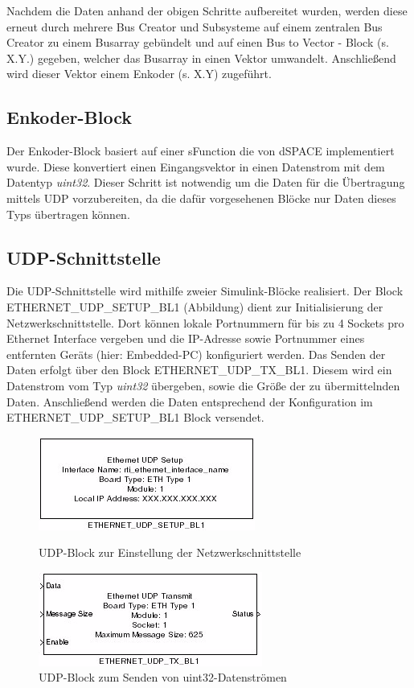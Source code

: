\documentclass[fontsize = 12pt, paper = a4]{scrreprt}
\begin{document}
Nachdem die Daten anhand der obigen Schritte aufbereitet wurden, werden diese erneut durch mehrere Bus Creator und Subsysteme auf einem zentralen Bus Creator zu einem Busarray gebündelt und auf einen Bus to Vector - Block (s. X.Y.) gegeben, welcher das Busarray in einen Vektor umwandelt. Anschließend wird dieser Vektor einem Enkoder (s. X.Y) zugeführt.

\newpage

\subsection{Enkoder-Block}

Der Enkoder-Block basiert auf einer sFunction die von dSPACE implementiert wurde. Diese konvertiert einen Eingangsvektor in einen Datenstrom mit dem Datentyp \textit{uint32}. Dieser Schritt ist notwendig um die Daten für die Übertragung mittels UDP vorzubereiten, da die dafür vorgesehenen Blöcke nur Daten dieses Typs übertragen können. 

\subsection{UDP-Schnittstelle}

Die UDP-Schnittstelle wird mithilfe zweier Simulink-Blöcke realisiert. Der Block ETHERNET\_UDP\_SETUP\_BL1 (\*Abbildung\*) dient zur Initialisierung der Netzwerkschnittstelle. Dort können lokale Portnummern für bis zu 4 Sockets pro Ethernet Interface vergeben und die IP-Adresse sowie Portnummer eines entfernten Geräts (hier: Embedded-PC) konfiguriert werden. Das Senden der Daten erfolgt über den Block ETHERNET\_UDP\_TX\_BL1. Diesem wird ein Datenstrom vom Typ \textit{uint32} übergeben, sowie die Größe der zu übermittelnden Daten. Anschließend werden die Daten entsprechend der Konfiguration im ETHERNET\_UDP\_SETUP\_BL1 Block versendet. 
 
\begin{figure}[h]
  \centering
\begin{minipage}[b]{2.5cm}
    \includegraphics[scale = 1]{ethernet_udp_setup_block.png}
    \caption{UDP-Block zur Einstellung der Netzwerkschnittstelle}
  \end{minipage}
\hspace*{3cm}  
  \begin{minipage}[b]{5 cm}
    \includegraphics[scale = 1]{ethernet_udp_send_block.png}
    \caption{UDP-Block zum Senden von uint32-Datenströmen}
  \end{minipage}
\end{figure}
\end{document}
